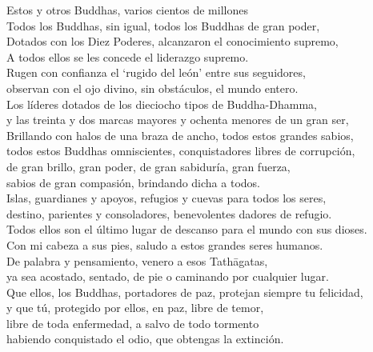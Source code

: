 \begin{onechants}
Estos y otros Buddhas, varios cientos de millones\\
Todos los Buddhas, sin igual, todos los Buddhas de gran poder,\\
Dotados con los Diez Poderes, alcanzaron el conocimiento supremo,\\
A todos ellos se les concede el liderazgo supremo.\\
Rugen con confianza el ‘rugido del león’ entre sus seguidores,\\
observan con el ojo divino, sin obstáculos, el mundo entero.\\
Los líderes dotados de los dieciocho tipos de Buddha-Dhamma,\\
y las treinta y dos marcas mayores y ochenta menores de un gran ser,\\
Brillando con halos de una braza de ancho, todos estos grandes sabios,\\
todos estos Buddhas omniscientes, conquistadores libres de corrupción,\\
de gran brillo, gran poder, de gran sabiduría, gran fuerza,\\
sabios de gran compasión, brindando dicha a todos.\\
Islas, guardianes y apoyos, refugios y cuevas para todos los seres,\\
destino, parientes y consoladores, benevolentes dadores de refugio.\\
Todos ellos son el último lugar de descanso para el mundo con sus dioses.\\
Con mi cabeza a sus pies, saludo a estos grandes seres humanos.\\
De palabra y pensamiento, venero a esos Tathāgatas,\\
ya sea acostado, sentado, de pie o caminando por cualquier lugar.\\
Que ellos, los Buddhas, portadores de paz, protejan siempre tu felicidad,\\
y que tú, protegido por ellos, en paz, libre de temor,\\
libre de toda enfermedad, a salvo de todo tormento\\
habiendo conquistado el odio, que obtengas la extinción.\\

\end{onechants}

\clearpage

\paliText

